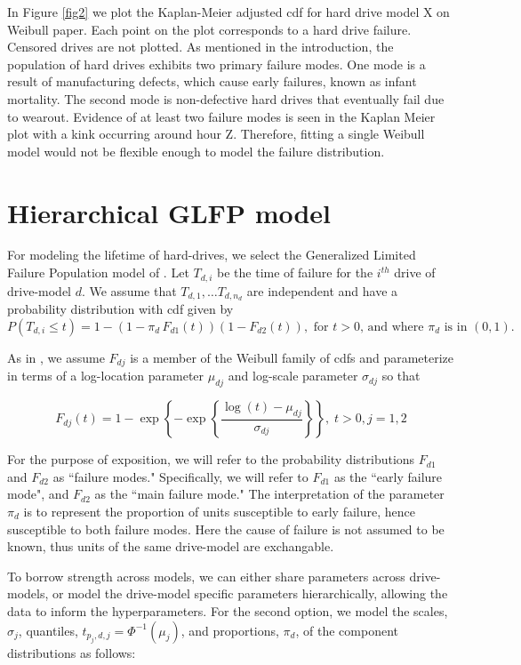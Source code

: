 \documentclass[12pt]{article}
\begin{document}
In Figure \ref{fig2} we plot the Kaplan-Meier adjusted cdf for hard drive model X on Weibull paper.  Each point on the plot corresponds to a hard drive failure.  Censored drives are not plotted.  As mentioned in the introduction, the population of hard drives exhibits two primary failure modes.  One mode is a result of manufacturing defects, which cause early failures, known as infant mortality.  The second mode is non-defective hard drives that eventually fail due to wearout.   Evidence of at least two failure modes is seen in the Kaplan Meier plot with a kink occurring around hour Z.  Therefore, fitting a single Weibull model would not be flexible enough to model the failure distribution.


\section{Hierarchical GLFP model}
For modeling the lifetime of hard-drives, we select the Generalized Limited Failure Population model of \citet{chan}.
Let $T_{d,i}$ be the time of failure for the $i^{th}$ drive of drive-model $d$.
We assume that $T_{d,1},\ldots T_{d,n_d}$ are independent and have a probability distribution with cdf given by
$$P(T_{d,i}\le t) = 1 - (1-\pi_d\, F_{d1}(t))(1 - F_{d2}(t)), \mbox{ for }t>0 \mbox{, and where } \pi_d \mbox{ is in }(0,1).$$

As in \cite{chan}, we assume $F_{dj}$ is a member of the Weibull family of cdfs and parameterize in terms of a log-location parameter $\mu_{dj}$ and log-scale parameter $\sigma_{dj}$ so that

$$F_{dj}(t) = 1 - \exp \left\{ -\exp \left\{ \frac{ \log (t) - \mu_{dj}}{\sigma_{dj}} \right\} \right\},\; t>0, j=1,2$$

For the purpose of exposition, we will refer to the probability distributions $F_{d1}$ and $F_{d2}$ as ``failure modes." Specifically, we will refer to $F_{d1}$ as the ``early failure mode", and $F_{d2}$ as the ``main failure mode." The interpretation of the parameter $\pi_d$ is to represent the proportion of units susceptible to early failure, hence susceptible to both failure modes. Here the cause of failure is not assumed to be known, thus units of the same drive-model are exchangable.

To borrow strength across models, we can either share parameters across drive-models, or model the drive-model specific parameters hierarchically, allowing the data to inform the hyperparameters. For the second option, we model the scales, $\sigma_j$, quantiles, $t_{p_j,d,j} = \Phi^{-1}(\mu_j)$, and proportions, $\pi_d$, of the component distributions as follows:
\end{document}
